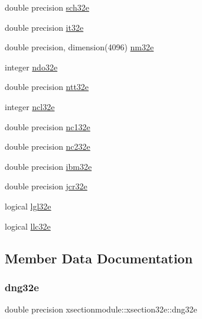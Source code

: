 \begin{DoxyCompactItemize}
\item 
double precision \hyperlink{structxsectionmodule_1_1xsection32e_a7c6eaf32ae5aee0c295b195a9ab24e2b}{sch32e}
\item 
double precision \hyperlink{structxsectionmodule_1_1xsection32e_a031bef3bb739472e44044f15c0bd8986}{it32e}
\item 
double precision, dimension(4096) \hyperlink{structxsectionmodule_1_1xsection32e_ac0ea1e8638648f1006f2c7f39a71eda5}{nm32e}
\item 
integer \hyperlink{structxsectionmodule_1_1xsection32e_ac904a2269bd02076ac178dfeba2d8cc1}{ndo32e}
\item 
double precision \hyperlink{structxsectionmodule_1_1xsection32e_af8cb9ed965c46878e126b95611c2f178}{ntt32e}
\item 
integer \hyperlink{structxsectionmodule_1_1xsection32e_a07dd9bec293bf4584e2cf9abc9d49d5e}{ncl32e}
\item 
double precision \hyperlink{structxsectionmodule_1_1xsection32e_ad3eaf2957deb037c153e9ce18e52b175}{nc132e}
\item 
double precision \hyperlink{structxsectionmodule_1_1xsection32e_abc688b6b76a8937d878ecba5bf8e97f4}{nc232e}
\item 
double precision \hyperlink{structxsectionmodule_1_1xsection32e_ab9763e7c31313cd8c6d4e1f23282d1e6}{ibm32e}
\item 
double precision \hyperlink{structxsectionmodule_1_1xsection32e_ab809381bff84e2b7969e8ddab8bb3353}{jcr32e}
\item 
logical \hyperlink{structxsectionmodule_1_1xsection32e_a569c0f01ee5a3b29ca8a867a83a1e3d3}{lgl32e}
\item 
logical \hyperlink{structxsectionmodule_1_1xsection32e_ac6b24aafab847677528bd46486ded85f}{llc32e}
\end{DoxyCompactItemize}


\subsection{Member Data Documentation}
\mbox{\label{structxsectionmodule_1_1xsection32e_a6507da76d141487639bbf6f3870349f5}} 
\subsubsection{\texorpdfstring{dng32e}{dng32e}}
{\footnotesize\ttfamily double precision xsectionmodule\+::xsection32e\+::dng32e}


